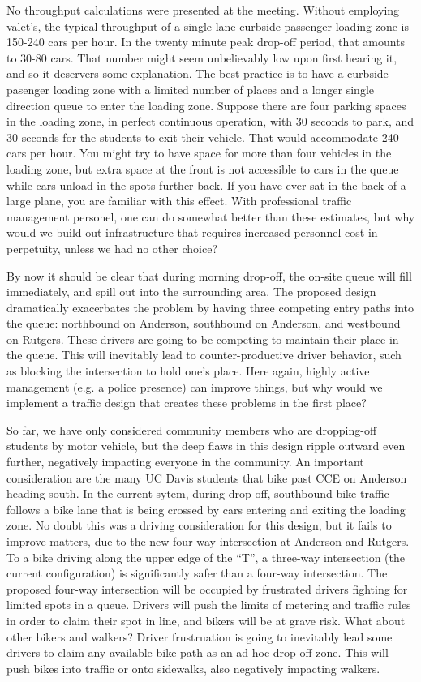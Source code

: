 \documentclass[12pt]{article}
\begin{document}
No throughput calculations were presented at the meeting.  Without
employing valet's, the typical throughput of a single-lane curbside
passenger loading zone is 150-240 cars per hour.  In the twenty minute
peak drop-off period, that amounts to 30-80 cars.  That number might
seem unbelievably low upon first hearing it, and so it deservers some
explanation.  The best practice is to have a curbside pasenger loading
zone with a limited number of places and a longer single direction
queue to enter the loading zone.  Suppose there are four parking
spaces in the loading zone, in perfect continuous operation, with 30
seconds to park, and 30 seconds for the students to exit their
vehicle.  That would accommodate 240 cars per hour.  You might try to
have space for more than four vehicles in the loading zone, but extra
space at the front is not accessible to cars in the queue while cars
unload in the spots further back.  If you have ever sat in the back of
a large plane, you are familiar with this effect.  With professional
traffic management personel, one can do somewhat better than these
estimates, but why would we build out infrastructure that requires
increased personnel cost in perpetuity, unless we had no other choice?

By now it should be clear that during morning drop-off, the on-site
queue will fill immediately, and spill out into the surrounding area.
The proposed design dramatically exacerbates the problem by having
three competing entry paths into the queue: northbound on Anderson,
southbound on Anderson, and westbound on Rutgers.  These drivers are
going to be competing to maintain their place in the queue. This will
inevitably lead to counter-productive driver behavior, such as
blocking the intersection to hold one's place.  Here again, highly
active management (e.g. a police presence) can improve things, but why
would we implement a traffic design that creates these problems in the
first place?

So far, we have only considered community members who are dropping-off
students by motor vehicle, but the deep flaws in this design ripple
outward even further, negatively impacting everyone in the community.
An important consideration are the many UC Davis students that bike
past CCE on Anderson heading south.  In the current sytem, during
drop-off, southbound bike traffic follows a bike lane that is being
crossed by cars entering and exiting the loading zone.  No doubt this
was a driving consideration for this design, but it fails to improve
matters, due to the new four way intersection at Anderson and Rutgers.
To a bike driving along the upper edge of the ``T'', a three-way
intersection (the current configuration) is significantly safer than a
four-way intersection.  The proposed four-way intersection will be
occupied by frustrated drivers fighting for limited spots in a queue.
Drivers will push the limits of metering and traffic rules in order to
claim their spot in line, and bikers will be at grave risk.  What
about other bikers and walkers?  Driver frustruation is going to
inevitably lead some drivers to claim any available bike path as an
ad-hoc drop-off zone.  This will push bikes into traffic or onto
sidewalks, also negatively impacting walkers.
\end{document}
